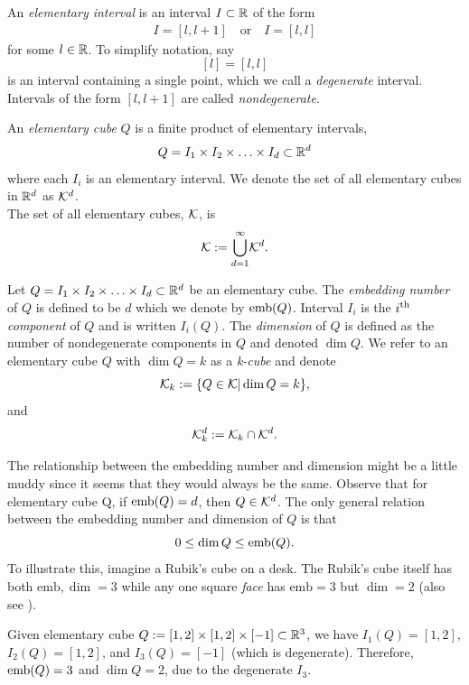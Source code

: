 \begin{defn}
	An \textit{elementary interval} is an interval $I \subset \mathbb{R}$ of the form
	\begin{align*}
		I = [ l, l+1 ] \quad \text{or} \quad I = [l,l]
	\end{align*}
	for some $l \in \mathbb{R}$. To simplify notation, say $$[l] = [l, l]$$ is an interval containing a single point, which we call a \textit{degenerate} interval. Intervals of the form $[l, l+1]$ are called \textit{nondegenerate}.
\end{defn}

\begin{defn}
	An \textit{elementary cube} $Q$ is a finite product of elementary intervals, $$ Q = I_1 \times I_2 \times \ldots \times I_d \subset \mathbb{R}^d $$ where each $I_i$ is an elementary interval. We denote the set of all elementary cubes in $\mathbb{R}^d$ as $\mathcal{K}^{d}$. \\
	The set of all elementary cubes, $\mathcal{K}$, is
	$$ \mathcal{K} := { \bigcup_{d=1}^{\infty} } \mathcal{K}^{d} . $$
\end{defn}

\begin{defn}
	Let $Q = I_1 \times I_2 \times \ldots \times I_d \subset \mathbb{R}^d$ be an elementary cube. The \textit{embedding number} of $Q$ is defined to be $d$ which we denote by $\mathord{\mathrm{emb}(Q)}$. Interval $I_i$ is the $i\textsuperscript{th}$ \textit{component} of $Q$ and is written $\mathord{I_i(Q)}$. The \textit{dimension} of $Q$ is defined as the number of nondegenerate components in $Q$ and denoted $\dim{Q}$. We refer to an elementary cube $Q$ with $\dim{Q} = k$ as a \textit{k-cube} and denote
	$$ \mathcal{K}_k := \{ Q \in \mathcal{K} | \dim{Q} = k \},$$ and
	$$ \mathcal{K}_{k}^{d} := \mathcal{K}_k \cap \mathcal{K}^{d}. $$
\end{defn}
The relationship between the embedding number and dimension might be a little muddy since it seems that they would always be the same. Observe that for elementary cube {Q}, if $\mathord{\mathrm{emb}(Q)} = d$, then $Q \in \mathcal{K}^{d}$. The only general relation between the embedding number and dimension of $Q$ is that $$ 0 \leq \dim{Q} \leq \mathord{\mathrm{emb}(Q)} .$$ To illustrate this, imagine a Rubik's cube on a desk. The Rubik's cube itself has both $\text{emb}, \dim = 3$ while any one square \textit{face} has $\text{emb} = 3$ but $\dim = 2$ (also see ).

\begin{exmp} \label{ex:embvsdim}
	Given elementary cube $Q := [1,2] \times [1,2] \times [-1] \subset \mathbb{R}^3$, we have $I_1(Q) = [1,2]$, $I_2(Q) = [1,2]$, and $I_3(Q) = [-1]$ (which is degenerate). Therefore, $\mathord{\mathrm{emb}(Q)} = 3$ and $\dim{Q} = 2$, due to the degenerate $I_3$.
\end{exmp}

